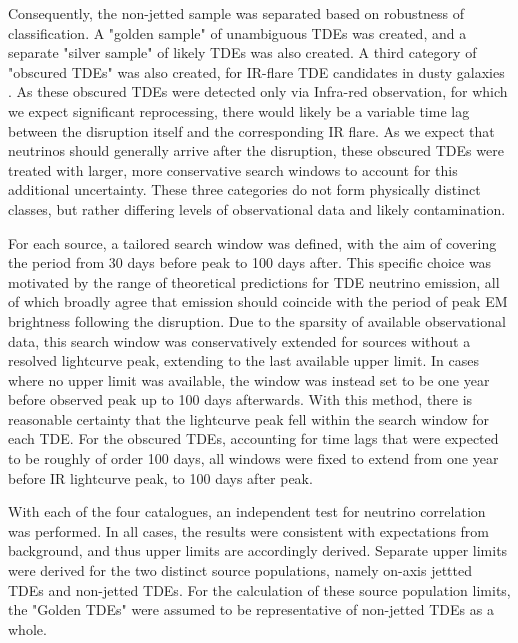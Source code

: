 \documentclass{PoS}
\begin{document}
Consequently, the non-jetted sample was separated based on robustness of classification. A "golden sample" of unambiguous TDEs was created, and a separate "silver sample" of likely TDEs was also created. A third category of "obscured TDEs" was also created, for IR-flare TDE candidates in dusty galaxies \cite{Wang:2018mxl}. As these obscured TDEs were detected only via Infra-red observation, for which we expect significant reprocessing, there would likely be a variable time lag between the disruption itself and the corresponding IR flare. As we expect that neutrinos should generally arrive after the disruption, these obscured TDEs were treated with larger, more conservative search windows to account for this additional uncertainty. These three categories do not form physically distinct classes, but rather differing levels of observational data and likely contamination.

For each source, a tailored search window was defined, with the aim of covering the period from 30 days before peak to 100 days after. This specific choice was motivated by the range of theoretical predictions for TDE neutrino emission, all of which broadly agree that emission should coincide with the period of peak EM brightness following the disruption. Due to the sparsity of available observational data, this search window was conservatively extended for sources without a resolved lightcurve peak, extending to the last available upper limit. In cases where no upper limit was available, the window was instead set to be one year before observed peak up to 100 days afterwards. With this method, there is reasonable certainty that the lightcurve peak fell within the search window for each TDE. For the obscured TDEs, accounting for time lags that were expected to be roughly of order 100 days, all windows were fixed to extend from one year before IR lightcurve peak, to 100 days after peak.

With each of the four catalogues, an independent test for neutrino correlation was performed. In all cases, the results were consistent with expectations from background, and thus upper limits are accordingly derived. Separate upper limits were derived for the two distinct source populations, namely on-axis jettted TDEs and non-jetted TDEs. For the calculation of these source population limits, the "Golden TDEs" were assumed to be representative of non-jetted TDEs as a whole. 
\end{document}
